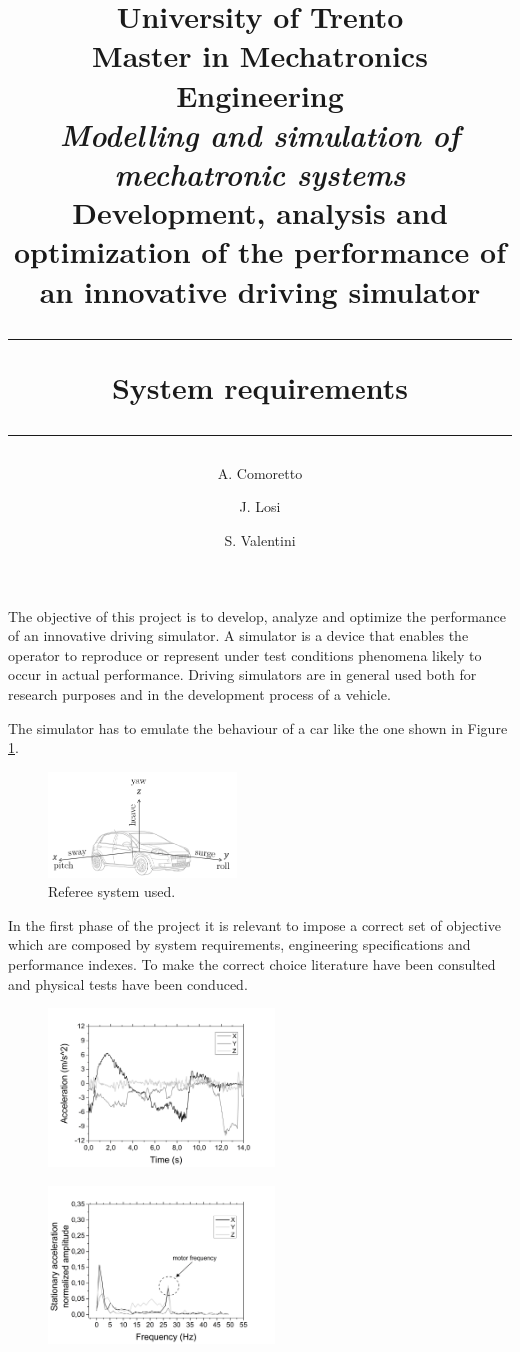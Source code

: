 \documentclass[10.5pt, twocolumn]{article}
\title{
	\large{University of Trento}\\
	\normalsize{Master in Mechatronics Engineering}\\
	\vspace{0.2cm}
	\large{\textit{Modelling and simulation of mechatronic systems}}\\
	\vspace{0.2cm}
	\Large{\textbf{Development, analysis and optimization of the performance of an innovative driving simulator}}\\
	\vspace{0.25cm}
	\hrule
	\vspace{0.2cm}
	\large{\textbf{System requirements}}\\	%
	\vspace{0.2cm}
	\hrule
}
\author{A. Comoretto \and J. Losi \and S. Valentini}
\date{}
\begin{document}
\maketitle
The objective of this project is to develop, analyze and optimize the performance of an innovative driving simulator.
A simulator is a device that enables the operator to reproduce or represent under test conditions phenomena likely to occur in actual performance.
Driving simulators are in general used both for research purposes and in the development process of a vehicle.

The simulator has to emulate the behaviour of a car like the one shown in Figure \ref{f:RefereeSystem}.
\begin{figure}[h!]
	\centering
	\includegraphics[width=5cm]{Images/Car_axes}
	\caption{Referee system used.}
	\label{f:RefereeSystem}
\end{figure}
In the first phase of the project it is relevant to impose a correct set of objective which are composed by system requirements, engineering specifications and performance indexes.
To make the correct choice literature have been consulted and physical tests have been conduced.

\begin{figure}[h!]
	\centering
	\includegraphics[width=6cm]{Images/Acceleration}
\end{figure}

\begin{figure}[h!]
	\centering
	\includegraphics[width=6cm]{Images/FFTStationary}
\end{figure}
\end{document}
